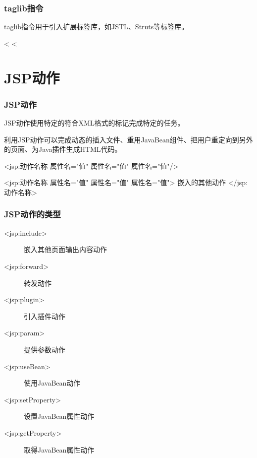 \begin{frame}[fragile] %

  \frametitle{taglib指令} 

  taglib指令用于引入扩展标签库，如JSTL、Struts等标签库。

  
  \begin{jspCode}
    <%
    <%
  \end{jspCode}
\end{frame}

\section{JSP动作}

\begin{frame} %
  \frametitle{JSP动作} 

  JSP动作使用特定的符合XML格式的标记完成特定的任务。

  利用JSP动作可以完成动态的插入文件、重用JavaBean组件、把用户重定向到另外的页面、为Java插件生成HTML代码。

  

  \begin{jspCode}
    <jsp:动作名称 属性名="值" 属性名="值" 属性名="值"/>
  \end{jspCode}


  \begin{jspCode}
    <jsp:动作名称 属性名="值" 属性名="值" 属性名="值">
      嵌入的其他动作
    </jsp:动作名称>
  \end{jspCode}
\end{frame}

\begin{frame}[fragile] %
  \frametitle{JSP动作的类型} 
  \begin{description}
  \item[<jsp:include>] 嵌入其他页面输出内容动作
  \item[<jsp:forward>] 转发动作
  \item[<jsp:plugin>] 引入插件动作
  \item[<jsp:param>] 提供参数动作
  \item[<jsp:useBean>] 使用JavaBean动作
  \item[<jsp:setProperty>] 设置JavaBean属性动作
  \item[<jsp:getProperty>] 取得JavaBean属性动作
  \end{description}
\end{frame}

